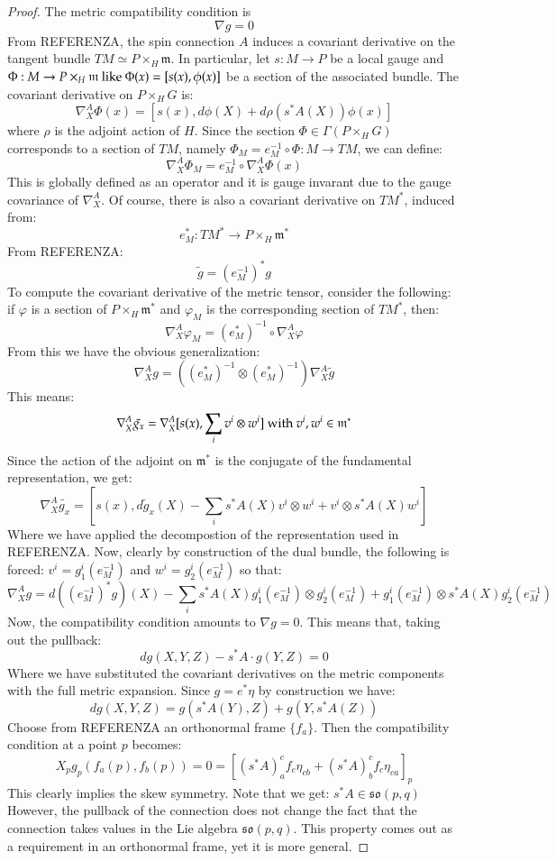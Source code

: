 \documentclass[12pt,a4paper]{report}
\theoremstyle{definition}
\theoremstyle{Theorem}
\theoremstyle{break}
\theoremstyle{definition}
\begin{document}
	\begin{proof}
		The metric compatibility condition is 
		$$\nabla g=0$$
		From REFERENZA, the spin connection $A$ induces a covariant derivative on the tangent bundle $TM\simeq P\times_H \mathfrak{m}$. In particular, let $s:M\rightarrow P$ be a local gauge and $\Phi:M\rightarrow P\times_H \mathfrak{m}\hbox{ like }\Phi(x)=[s(x),\phi(x)]$ be a section of the associated bundle. The covariant derivative on $P\times_H G$ is:
		$$\nabla^A_X \Phi(x)=[s(x),d\phi(X)+d\rho(s^*A(X))\phi(x)]$$
		where $\rho$ is the adjoint action of $H$. Since the section $\Phi\in\Gamma(P\times_H G)$ corresponds to a section of $TM$, namely $\Phi_M=e_M^{-1}\circ\Phi:M\rightarrow TM$, we can define:
		$$\nabla_X^A\Phi_M=e_M^{-1}\circ \nabla^A_X \Phi(x)$$
		This is globally defined as an operator and it is gauge invarant due to the gauge covariance of $\nabla^A_X$. Of course, there is also a covariant derivative on $TM^*$, induced from:
		$$e_M^*:TM^*\rightarrow P\times_H \mathfrak{m}^*$$
		From REFERENZA:
		$$\tilde{g}=(e_M^{-1})^*g$$
		To compute the covariant derivative of the metric tensor, consider the following: if $\varphi$ is a section of $P\times_H \mathfrak{m}^*$ and $\varphi_M$ is the corresponding section of $TM^*$, then:
		$$\nabla_X^A\varphi_M=(e_M^*)^{-1}\circ \nabla_X^A\varphi$$
		From this we have the obvious generalization:
		$$\nabla_X^A g=((e_M^*)^{-1}\otimes(e_M^*)^{-1})\nabla_X^A \tilde{g}$$
		This means:
		$$\nabla_X^A \tilde{g_x}=\nabla_X^A[s(x),\sum_iv^i\otimes w^i]\hbox{ with }v^i,w^i\in \mathfrak{m}^*$$
		Since the action of the adjoint on $\mathfrak{m}^*$ is the conjugate of the fundamental representation, we get:
		$$\nabla_X^A \tilde{g_x}=[s(x),d\tilde{g}_x(X)-\sum_is^*A(X)v^i\otimes w^i+v^i\otimes s^*A(X)w^i]$$
		Where we have applied the decompostion of the representation used in REFERENZA. Now, clearly by construction of the dual bundle, the following is forced: $v^i=g^i_1(e_M^{-1})$ and $w^i=g^i_2(e_M^{-1})$ so that:
		$$\nabla_X^A g=d((e_M^{-1})^*g)(X)-\sum_i s^*A(X)g^i_1(e_M^{-1})\otimes g^i_2(e_M^{-1})+g^i_1(e_M^{-1})\otimes s^*A(X)g^i_2(e_M^{-1})$$ 
		Now, the compatibility condition amounts to $\nabla g=0$. This means that, taking out the pullback:
		$$dg(X,Y,Z)-s^*A\cdot g(Y,Z)=0$$
		Where we have substituted the covariant derivatives on the metric components with the full metric expansion. Since $g=e^*\eta$ by construction we have:
		$$dg(X,Y,Z)=g(s^*A(Y),Z)+g(Y,s^*A(Z))$$
		Choose from REFERENZA an orthonormal frame $\{f_a\}$. Then the compatibility condition at a point $p$ becomes:
		$$X_pg_p(f_a(p),f_b(p))=0=[(s^*A)_a^cf_c \eta_{cb}+(s^*A)_b^cf_c \eta_{ca}]_p$$
		This clearly implies the skew symmetry. Note that we get: $s^*A\in\mathfrak{so}(p,q)$
		However, the pullback of the connection does not change the fact that the connection takes values in the Lie algebra $\mathfrak{so}(p,q)$. This property comes out as a requirement in an orthonormal frame, yet it is more general.
	\end{proof}
\end{document}
